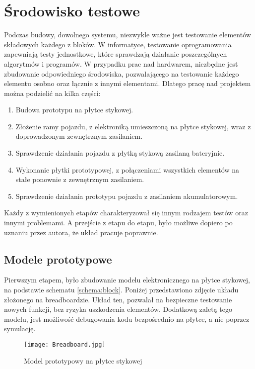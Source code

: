 \section{Środowisko testowe}
\label{sec:testing}
    Podczas budowy, dowolnego systemu, niezwykle ważne jest testowanie elementów składowych każdego z bloków.
    W informatyce, testowanie oprogramowania zapewniają testy jednostkowe, które sprawdzają działanie poszczególnych algorytmów i programów.
    W przypadku prac nad hardwarem, niezbędne jest zbudowanie odpowiedniego środowiska, pozwalającego na testowanie każdego elementu osobno oraz łącznie z innymi elementami.
    Dlatego pracę nad projektem można podzielić na kilka części:
    \begin{enumerate}
        \item Budowa prototypu na płytce stykowej.
        \item Złożenie ramy pojazdu, z elektroniką umieszczoną na płytce stykowej, wraz z doprowadzonym zewnętrznym zasilaniem.
        \item Sprawdzenie działania pojazdu z płytką stykową zasilaną bateryjnie.
        \item Wykonanie płytki prototypowej, z połączeniami wszystkich elementów na stałe ponownie z zewnętrznym zasilaniem.
        \item Sprawdzenie działania prototypu pojazdu z zasilaniem akumulatorowym.
    \end{enumerate}
    Każdy z wymienionych etapów charakteryzował się innym rodzajem testów oraz innymi problemami.
    A przejście z etapu do etapu, było możliwe dopiero po uznaniu przez autora, że układ pracuje poprawnie.

    \subsection{Modele prototypowe}
        Pierwszym etapem, było zbudowanie modelu elektronicznego na płytce stykowej, na podstawie schematu \ref{schema:block}.
        Poniżej przedstawiono zdjęcie układu złożonego na breadboardzie.
        Układ ten, pozwalał na bezpieczne testowanie nowych funkcji, bez ryzyka uszkodzenia elementów.
        Dodatkową zaletą tego modelu, jest możliwość debugowania kodu bezpośrednio na płytce, a nie poprzez symulację.
        \begin{figure}[!ht]
            \centering
            \texttt{[image: Breadboard.jpg]}
            \caption{Model prototypowy na płytce stykowej}
            \label{fig:breadboard}
        \end{figure}

